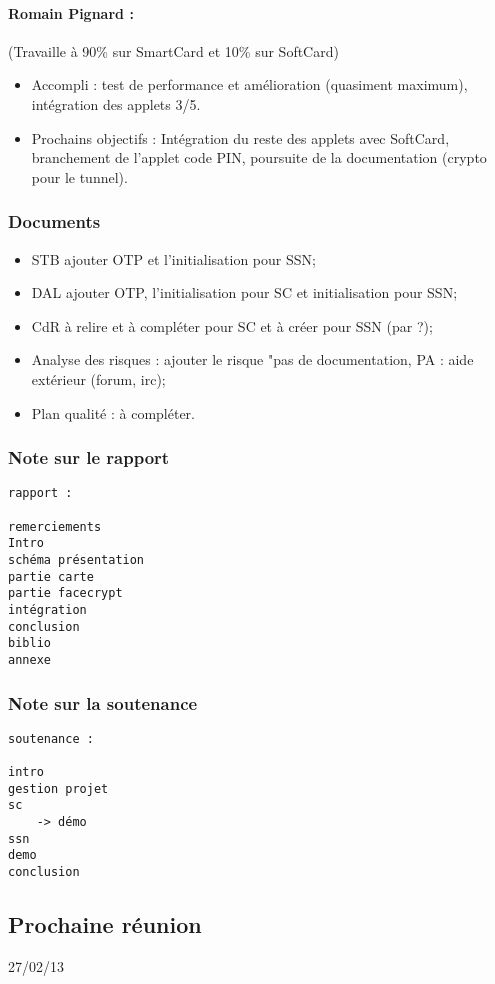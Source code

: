 \documentclass[a4paper,10pt]{article}
\begin{document}
\paragraph{Romain Pignard : } (Travaille à 90\% sur SmartCard et 10\% sur SoftCard)
\begin{itemize}
    \item Accompli : test de performance et amélioration (quasiment maximum),
    intégration des applets 3/5.
\item Prochains objectifs : Intégration du reste des applets avec SoftCard, 
   branchement de l'applet code PIN, poursuite de la documentation (crypto pour
           le tunnel).
\end{itemize}

\subsubsection*{Documents}
\begin{itemize}
    \item STB ajouter OTP et l'initialisation pour SSN;
    \item DAL ajouter OTP, l'initialisation pour SC et initialisation pour SSN;
    \item CdR à relire et à compléter pour SC et à créer pour SSN (par ?);
    \item Analyse des risques : ajouter le risque "pas de documentation, 
    PA : aide extérieur (forum, irc);
    \item Plan qualité : à compléter.
\end{itemize}

\subsubsection*{Note sur le rapport}
\begin{verbatim}
rapport :

remerciements
Intro
schéma présentation
partie carte
partie facecrypt
intégration
conclusion
biblio
annexe
\end{verbatim}
\subsubsection*{Note sur la soutenance}
\begin{verbatim}
soutenance :

intro
gestion projet
sc
    -> démo
ssn
demo
conclusion
\end{verbatim}

\subsection*{Prochaine réunion}
27/02/13
\end{document}
